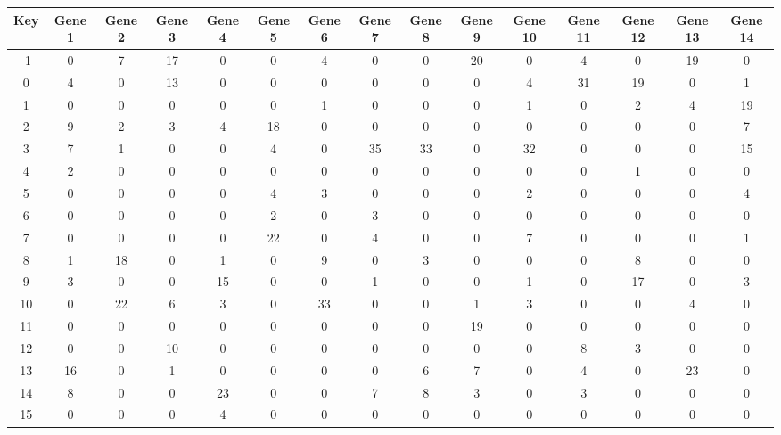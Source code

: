 \begin{tabular}{|c|c|c|c|c|c|c|c|c|c|c|c|c|c|c|}
\hline
Key & Gene 1 & Gene 2 & Gene 3 & Gene 4 & Gene 5 & Gene 6 & Gene 7 & Gene 8 & Gene 9 & Gene 10 & Gene 11 & Gene 12 & Gene 13 & Gene 14 \\
\hline
-1 & 0 & 7 & 17 & 0 & 0 & 4 & 0 & 0 & 20 & 0 & 4 & 0 & 19 & 0 \\
0 & 4 & 0 & 13 & 0 & 0 & 0 & 0 & 0 & 0 & 4 & 31 & 19 & 0 & 1 \\
1 & 0 & 0 & 0 & 0 & 0 & 1 & 0 & 0 & 0 & 1 & 0 & 2 & 4 & 19 \\
2 & 9 & 2 & 3 & 4 & 18 & 0 & 0 & 0 & 0 & 0 & 0 & 0 & 0 & 7 \\
3 & 7 & 1 & 0 & 0 & 4 & 0 & 35 & 33 & 0 & 32 & 0 & 0 & 0 & 15 \\
4 & 2 & 0 & 0 & 0 & 0 & 0 & 0 & 0 & 0 & 0 & 0 & 1 & 0 & 0 \\
5 & 0 & 0 & 0 & 0 & 4 & 3 & 0 & 0 & 0 & 2 & 0 & 0 & 0 & 4 \\
6 & 0 & 0 & 0 & 0 & 2 & 0 & 3 & 0 & 0 & 0 & 0 & 0 & 0 & 0 \\
7 & 0 & 0 & 0 & 0 & 22 & 0 & 4 & 0 & 0 & 7 & 0 & 0 & 0 & 1 \\
8 & 1 & 18 & 0 & 1 & 0 & 9 & 0 & 3 & 0 & 0 & 0 & 8 & 0 & 0 \\
9 & 3 & 0 & 0 & 15 & 0 & 0 & 1 & 0 & 0 & 1 & 0 & 17 & 0 & 3 \\
10 & 0 & 22 & 6 & 3 & 0 & 33 & 0 & 0 & 1 & 3 & 0 & 0 & 4 & 0 \\
11 & 0 & 0 & 0 & 0 & 0 & 0 & 0 & 0 & 19 & 0 & 0 & 0 & 0 & 0 \\
12 & 0 & 0 & 10 & 0 & 0 & 0 & 0 & 0 & 0 & 0 & 8 & 3 & 0 & 0 \\
13 & 16 & 0 & 1 & 0 & 0 & 0 & 0 & 6 & 7 & 0 & 4 & 0 & 23 & 0 \\
14 & 8 & 0 & 0 & 23 & 0 & 0 & 7 & 8 & 3 & 0 & 3 & 0 & 0 & 0 \\
15 & 0 & 0 & 0 & 4 & 0 & 0 & 0 & 0 & 0 & 0 & 0 & 0 & 0 & 0 \\
\hline
\end{tabular}